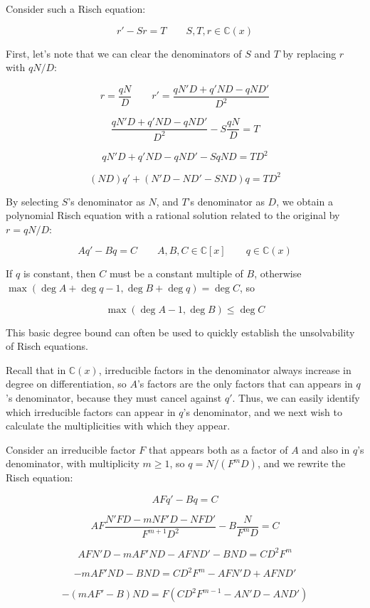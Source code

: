 Consider such a Risch equation:

$$r' - S r = T \qquad S,T,r \in {\mathbb C}(x)$$

First, let's note that we can clear the denominators of $S$ and $T$ by
replacing $r$ with $qN/D$:

$$r = \frac{qN}{D} \qquad r' = \frac{q N' D + q' N D - q N D'}{D^2}$$

$$\frac{q N' D + q' N D - q N D'}{D^2} - S \frac{qN}{D} = T$$

$$q N' D + q' N D - q N D' - S q N D = T D^2$$

$$(N D) q' + (N' D - N D' - S N D) q = T D^2$$

By selecting $S$'s denominator as $N$, and $T$'s denominator as $D$,
we obtain a polynomial Risch equation with a rational solution related
to the original by $r=qN/D$:

$$A q' - B q = C \qquad A,B,C \in {\mathbb C}[x] \qquad q \in {\mathbb C}(x)$$

If $q$ is constant, then $C$ must be a constant multiple of $B$,
otherwise $\max(\deg A + \deg q - 1, \deg B + \deg q) = \deg C$, so

$$\max(\deg A - 1, \deg B) \le \deg C$$

This basic degree bound can often be used to quickly establish
the unsolvability of Risch equations.

Recall that in ${\mathbb C}(x)$, irreducible factors in the
denominator always increase in degree on differentiation, so $A$'s
factors are the only factors that can appears in $q$'s denominator,
because they must cancel against $q'$.  Thus, we can easily identify
which irreducible factors can appear in $q$'s denominator, and we next
wish to calculate the multiplicities with which they appear.

\vfill\eject

Consider an irreducible factor $F$ that appears both as a factor of $A$
and also in $q$'s denominator, with
multiplicity $m \ge 1 $, so $q = N/(F^m D)$, and we rewrite the Risch equation:

$$A F q' - B q = C$$

$$A F \frac{N' F D - m N F' D - N F D'}{F^{m+1} D^2} - B \frac{N}{F^m D} = C$$

$$A F N' D - m A F' N D - A F N D' - B N D = C D^2 F^{m}$$

$$ - m A F' N D - B N D  = C D^2 F^{m} - A F N' D + A F N D'$$

$$ - (m A F' - B ) N D  = F (C D^2 F^{m-1} - A N' D - A N D')$$

